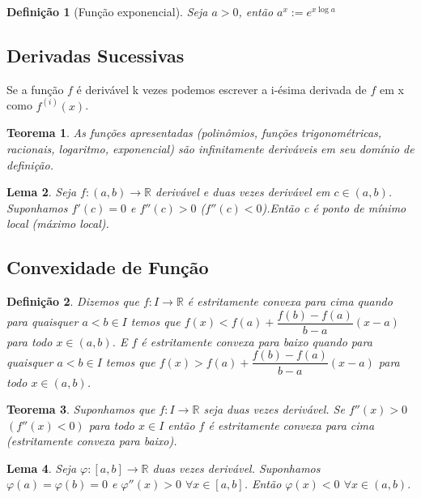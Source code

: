 \documentclass[12pt]{article}
\newtheorem{theorem}{Teorema}[section]
\newtheorem{lemma}[theorem]{Lema}
\newtheorem{definition}{Definição}
\begin{document}
\begin{definition}[Função exponencial]
    Seja $a > 0$, então $a^x := e^{x\log a}$
\end{definition}

\subsection{Derivadas Sucessivas}
\label{s6}

Se a função $f$ é derivável k vezes podemos escrever a i-ésima derivada de $f$ em x como $f^{(i)}(x)$.

\begin{theorem}
    As funções apresentadas (polinômios, funções trigonométricas, racionais, logaritmo, exponencial) são infinitamente deriváveis em seu domínio de definição.
\end{theorem}

\begin{lemma}
    Seja $f: (a, b) \rightarrow{} \mathbb{R}$ derivável e duas vezes derivável em $c \in (a, b)$. Suponhamos $f'(c) = 0$ e $f''(c) > 0$ ($f''(c) < 0$).Então c é ponto de mínimo local (máximo local).
\end{lemma}

\subsection{Convexidade de Função}
\label{s7}

\begin{definition}
    Dizemos que $f: I \rightarrow{} \mathbb{R}$ é estritamente convexa para cima quando para quaisquer $a < b \in I$ temos que $f(x) < f(a) + \dfrac{f(b) - f(a)}{b - a}(x - a)$ para todo $x \in (a, b)$. E $f$ é estritamente convexa para baixo quando para quaisquer $a < b \in I$ temos que $f(x) > f(a) + \dfrac{f(b) - f(a)}{b - a}(x - a)$ para todo $x \in (a, b)$.
\end{definition}

\begin{theorem}
    Suponhamos que $f: I \rightarrow{} \mathbb{R}$ seja duas vezes derivável. Se $f''(x) > 0$ $(f''(x) < 0)$ para todo $x \in I$ então $f$ é estritamente convexa para cima (estritamente convexa para baixo).
\end{theorem}

\begin{lemma}
    Seja $\varphi: [a, b] \rightarrow{} \mathbb{R}$ duas vezes derivável. Suponhamos $\varphi (a) = \varphi (b) = 0$ e $\varphi'' (x) > 0$ $\forall x \in [a, b]$. Então $\varphi (x) < 0$ $\forall x \in (a, b).$
\end{lemma}
\end{document}
